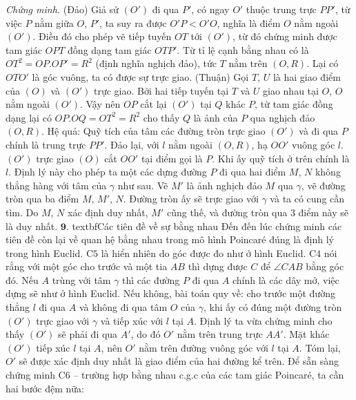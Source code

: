 \begin{multicols}{2}
\begin{figure}[H]
		\vspace*{-10pt}
	\end{figure}
	\textit{Chứng minh.} (Đảo) Giả sử $(O')$ đi qua $P'$, có ngay $O'$ thuộc trung trực $PP'$, từ việc $P$ nằm giữa $O$, $P'$, ta suy ra được $O'P<O'O$, nghĩa là điểm $O$ nằm ngoài $(O')$. Điều đó cho phép vẽ tiếp tuyến $OT$ tới $(O')$, từ đó chứng minh được tam giác $OPT$ đồng dạng tam giác $OTP'$. Từ tỉ lệ cạnh bằng nhau có là $OT^2 = OP.OP' = R^2$ (định nghĩa nghịch đảo), tức $T$ nằm trên $(O, R)$. Lại có $OTO'$ là góc vuông, ta có được sự trực giao.
	\vskip 0.1cm
	(Thuận) Gọi $T$, $U$ là hai giao điểm của $(O)$ và $(O')$ trực giao. Bởi hai tiếp tuyến tại $T$ và $U$ giao nhau tại $O$, $O$ nằm ngoài $(O')$. Vậy nên $OP$ cắt lại $(O')$ tại $Q$ khác $P$, từ tam giác đồng dạng lại có $OP.OQ = OT^2 = R^2$ cho thấy $Q$ là ảnh của $P$ qua nghịch đảo $(O, R)$.
	\vskip 0.1cm
	Hệ quả: Quỹ tích của tâm các đường tròn trực giao $(O')$ và đi qua $P$ chính là trung trực $PP'$.
	\vskip 0.1cm
	Đảo lại, với $l$ nằm ngoài $(O, R)$, hạ $OO'$ vuông góc $l$. $(O')$ trực giao $(O)$ cắt $OO'$ tại điểm gọi là $P$. Khi ấy quỹ tích ở trên chính là $l$.
	\vskip 0.1cm
	Định lý này cho phép ta một các dựng đường $P$ đi qua hai điểm $M$, $N$ không thẳng hàng với tâm của $\gamma$ như sau. Vẽ $M'$ là ảnh nghịch đảo $M$ qua $\gamma$, vẽ đường tròn qua ba điểm $M$, $M'$, $N$. Đường tròn ấy sẽ trực giao với $\gamma$ và ta có cung cần tìm. Do $M$, $N$ xác định duy nhất, $M'$ cũng thế, và đường tròn qua $3$ điểm này sẽ là duy nhất.
	\vskip 0.1cm
	$\pmb{9.}$ textbf{\color{lichsutoanhoc}Các tiên đề về sự bằng nhau}
	\vskip 0.1cm
	Đến đến lúc chứng minh các tiên đề còn lại về quan hệ bằng nhau trong mô hình Poincaré đúng là định lý trong hình Euclid.
	\vskip 0.1cm
	C$5$ là hiển nhiên do góc được đo như ở hình Euclid. C$4$ nói rằng với một góc cho trước và một tia $AB$ thì dựng được $C$ để $ \angle CAB$ bằng góc đó. Nếu $A$ trùng với tâm $ \gamma$ thì các đường $P$ đi qua $A$ chính là các dây mở, việc dựng sẽ như ở hình Euclid.
	\vskip 0.1cm
	Nếu không, bài toán quy về: cho trước một đường thẳng $l$ đi qua $A$ và không đi qua tâm $O$ của $\gamma$, khi ấy có đúng một đường tròn $(O')$ trực giao với $\gamma$ và tiếp xúc với $l$ tại $A$. 
	\vskip 0.1cm
	Định lý ta vừa chứng minh cho thấy $(O')$ sẽ phải đi qua $A'$, do đó $O'$ nằm trên trung trực $AA'$. Mặt khác $(O')$ tiếp xúc $l$ tại $A$, nên $O'$ nằm trên đường vuông góc với $l$ tại $A$. Tóm lại, $O'$ sẽ được xác định duy nhất là giao điểm của hai đường kể trên.
	\vskip 0.1cm
	Để sẵn sàng chứng minh C$6$ -- trường hợp bằng nhau c.g.c của các tam giác Poincaré, ta cần hai bước đệm nữa:

\end{multicols}
